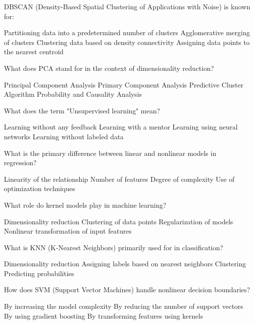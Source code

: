 \documentclass[a4paper,11pt,addpoints]{exam}
\begin{document}
\begin{questions}
\question[1] DBSCAN (Density-Based Spatial Clustering of Applications with Noise) is known for:
\begin{choices}
\choice Partitioning data into a predetermined number of clusters
\choice Agglomerative merging of clusters
\CorrectChoice Clustering data based on density connectivity
\choice Assigning data points to the nearest centroid
\end{choices}

\question[1] What does PCA stand for in the context of dimensionality reduction?
\begin{choices}
\CorrectChoice Principal Component Analysis 
\choice Primary Component Analysis
\choice Predictive Cluster Algorithm
\choice Probability and Causality Analysis
\end{choices}

\question[1] What does the term "Unsupervised learning" mean?
\begin{choices}
\choice Learning without any feedback
\choice Learning with a mentor
\choice Learning using neural networks
\CorrectChoice Learning without labeled data  
\end{choices}

\question[1] What is the primary difference between linear and nonlinear models in regression?
\begin{choices}
\choice Linearity of the relationship
\choice Number of features
\CorrectChoice Degree of complexity 
\choice Use of optimization techniques
\end{choices}

\question[1] What role do kernel models play in machine learning?
\begin{choices}
\choice Dimensionality reduction
\choice Clustering of data points
\choice Regularization of models
\CorrectChoice Nonlinear transformation of input features 
\end{choices}

\question[1] What is KNN (K-Nearest Neighbors) primarily used for in classification?
\begin{choices}
\choice Dimensionality reduction
\CorrectChoice Assigning labels based on nearest neighbors 
\choice Clustering
\choice Predicting probabilities
\end{choices}

\question[1]  How does SVM (Support Vector Machines) handle nonlinear decision boundaries?
\begin{choices}
\choice By increasing the model complexity
\choice By reducing the number of support vectors
\choice By using gradient boosting
\CorrectChoice By transforming features using kernels 
\end{choices}


\end{questions}
\end{document}
